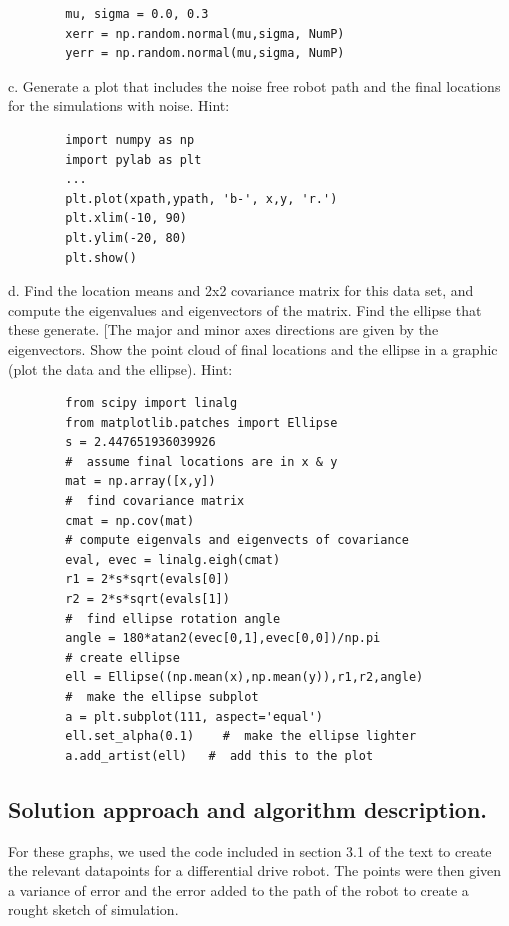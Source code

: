 \documentclass[letterpaper,11pt]{texMemo} %
\begin{document}
\begin{tiny}
    \begin{lstlisting}
        mu, sigma = 0.0, 0.3
        xerr = np.random.normal(mu,sigma, NumP)
        yerr = np.random.normal(mu,sigma, NumP)
    \end{lstlisting}
\end{tiny}

c. Generate a plot that includes the noise free robot path and the final locations for the
simulations with noise. Hint:

\begin{tiny}
    \begin{lstlisting}
        import numpy as np
        import pylab as plt
        ...
        plt.plot(xpath,ypath, 'b-', x,y, 'r.')
        plt.xlim(-10, 90)
        plt.ylim(-20, 80)
        plt.show()
    \end{lstlisting}
\end{tiny}

d. Find the location means and 2x2 covariance matrix for this data set, and compute the eigenvalues
and eigenvectors of the matrix. Find the ellipse that these generate. [The major and minor axes
directions are given by the eigenvectors. Show the point cloud of final locations and the ellipse 
in a graphic (plot the data and the ellipse). Hint:

\begin{tiny}
    \begin{lstlisting}
        from scipy import linalg
        from matplotlib.patches import Ellipse
        s = 2.447651936039926
        #  assume final locations are in x & y
        mat = np.array([x,y])
        #  find covariance matrix
        cmat = np.cov(mat)
        # compute eigenvals and eigenvects of covariance
        eval, evec = linalg.eigh(cmat)
        r1 = 2*s*sqrt(evals[0])
        r2 = 2*s*sqrt(evals[1])
        #  find ellipse rotation angle
        angle = 180*atan2(evec[0,1],evec[0,0])/np.pi
        # create ellipse
        ell = Ellipse((np.mean(x),np.mean(y)),r1,r2,angle)
        #  make the ellipse subplot
        a = plt.subplot(111, aspect='equal')
        ell.set_alpha(0.1)    #  make the ellipse lighter
        a.add_artist(ell)   #  add this to the plot
    \end{lstlisting}
\end{tiny}

\subsection*{Solution approach and algorithm description.}
For these graphs, we used the code included in section 3.1 of the text to create the relevant
datapoints for a differential drive robot. The points were then given a variance of error and the 
error added to the path of the robot to create a rought sketch of simulation. 
\end{document}
